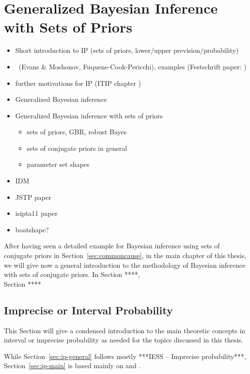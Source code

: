 \chapter{Generalized Bayesian Inference with Sets of Priors}

\begin{itemize}
\item Short introduction to IP (sets of priors, lower/upper prevision/probability)
\item \pdc\ (Evans \& Moshonov, Fuquene-Cook-Pericchi), examples (Festschrift paper: \cite{Walter2010a})
\item further motivations for IP (ITIP chapter \cite{itip-statinf}) 
\item Generalized Bayesian inference
\item Generalized Bayesian inference with sets of priors
 \begin{itemize}
 \item sets of priors, GBR, robust Bayes
 \item sets of conjugate priors in general
 \item parameter set shapes
 \end{itemize}
\item IDM
\item JSTP paper \cite{Walter2009a}
\item isipta11 paper \cite{Walter2011a}
\item boatshape?
\end{itemize}

After having seen a detailed example for Bayesian inference using sets of conjugate priors in Section~\ref{sec:commoncause},
in the main chapter of this thesis,
we will give now a general introduction to the methodology of Bayesian inference with sets of conjugate priors.
In Section ****, \\
Section **** 


\section{Imprecise or Interval Probability}
\label{sec:ip-intro}

This Section will give a condensed introduction to the main theoretic concepts
in interval or imprecise probability as needed for the topics discussed in this thesis.

While Section~\ref{sec:ip-general} follows mostly ***IESS -- Imprecise probability***,
Section~\ref{sec:ip-main} is based mainly on \textcite{1996:walley::expert} and \textcite{2000:walley::towards}.


